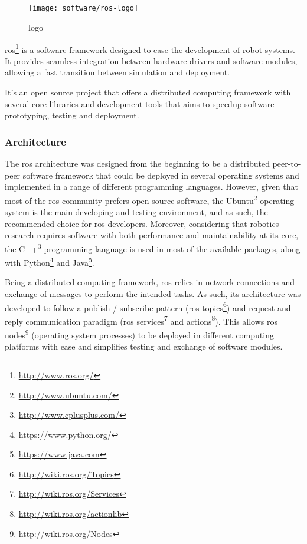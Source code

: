 \subsection{}

\begin{wrapfigure}{r}{0.25\textwidth}
	\centering
	\texttt{[image: software/ros-logo]}
	\caption{ logo}
	\label{fig:ros-logo}
\end{wrapfigure}

\gls{ros}\footnote{\url{http://www.ros.org/}} \cite{Quigley2009} is a software framework designed to ease the development of robot systems. It provides seamless integration between hardware drivers and software modules, allowing a fast transition between simulation and deployment.

It's an open source project that offers a distributed computing framework with several core libraries and development tools that aims to speedup software prototyping, testing and deployment.


\subsubsection{Architecture}

The \gls{ros} architecture was designed from the beginning to be a distributed peer-to-peer software framework that could be deployed in several operating systems and implemented in a range of different programming languages. However, given that most of the \gls{ros} community prefers open source software, the Ubuntu\footnote{\url{http://www.ubuntu.com/}} operating system is the main developing and testing environment, and as such, the recommended choice for \gls{ros} developers. Moreover, considering that robotics research requires software with both performance and maintainability at its core, the C++\footnote{\url{http://www.cplusplus.com/}} programming language is used in most of the available packages, along with Python\footnote{\url{https://www.python.org/}} and Java\footnote{\url{https://www.java.com}}.

Being a distributed computing framework, \gls{ros} relies in network connections and exchange of messages to perform the intended tasks. As such, its architecture was developed to follow a publish / subscribe pattern (\gls{ros} topics\footnote{\url{http://wiki.ros.org/Topics}}) and request and reply communication paradigm (\gls{ros} services\footnote{\url{http://wiki.ros.org/Services}} and actions\footnote{\url{http://wiki.ros.org/actionlib}}). This allows \gls{ros} nodes\footnote{\url{http://wiki.ros.org/Nodes}} (operating system processes) to be deployed in different computing platforms with ease and simplifies testing and exchange of software modules.

